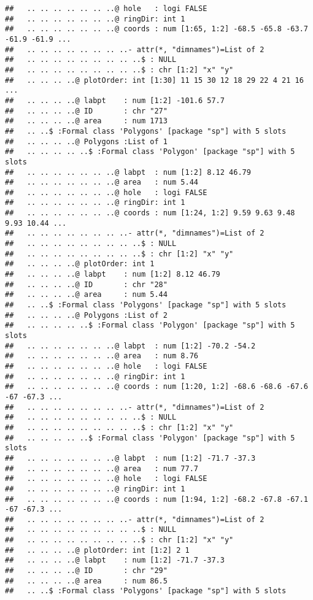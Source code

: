 \documentclass[]{article}
\begin{document}
\begin{verbatim}
##   .. .. .. .. .. .. ..@ hole   : logi FALSE
##   .. .. .. .. .. .. ..@ ringDir: int 1
##   .. .. .. .. .. .. ..@ coords : num [1:65, 1:2] -68.5 -65.8 -63.7 -61.9 -61.9 ...
##   .. .. .. .. .. .. .. ..- attr(*, "dimnames")=List of 2
##   .. .. .. .. .. .. .. .. ..$ : NULL
##   .. .. .. .. .. .. .. .. ..$ : chr [1:2] "x" "y"
##   .. .. .. ..@ plotOrder: int [1:30] 11 15 30 12 18 29 22 4 21 16 ...
##   .. .. .. ..@ labpt    : num [1:2] -101.6 57.7
##   .. .. .. ..@ ID       : chr "27"
##   .. .. .. ..@ area     : num 1713
##   .. ..$ :Formal class 'Polygons' [package "sp"] with 5 slots
##   .. .. .. ..@ Polygons :List of 1
##   .. .. .. .. ..$ :Formal class 'Polygon' [package "sp"] with 5 slots
##   .. .. .. .. .. .. ..@ labpt  : num [1:2] 8.12 46.79
##   .. .. .. .. .. .. ..@ area   : num 5.44
##   .. .. .. .. .. .. ..@ hole   : logi FALSE
##   .. .. .. .. .. .. ..@ ringDir: int 1
##   .. .. .. .. .. .. ..@ coords : num [1:24, 1:2] 9.59 9.63 9.48 9.93 10.44 ...
##   .. .. .. .. .. .. .. ..- attr(*, "dimnames")=List of 2
##   .. .. .. .. .. .. .. .. ..$ : NULL
##   .. .. .. .. .. .. .. .. ..$ : chr [1:2] "x" "y"
##   .. .. .. ..@ plotOrder: int 1
##   .. .. .. ..@ labpt    : num [1:2] 8.12 46.79
##   .. .. .. ..@ ID       : chr "28"
##   .. .. .. ..@ area     : num 5.44
##   .. ..$ :Formal class 'Polygons' [package "sp"] with 5 slots
##   .. .. .. ..@ Polygons :List of 2
##   .. .. .. .. ..$ :Formal class 'Polygon' [package "sp"] with 5 slots
##   .. .. .. .. .. .. ..@ labpt  : num [1:2] -70.2 -54.2
##   .. .. .. .. .. .. ..@ area   : num 8.76
##   .. .. .. .. .. .. ..@ hole   : logi FALSE
##   .. .. .. .. .. .. ..@ ringDir: int 1
##   .. .. .. .. .. .. ..@ coords : num [1:20, 1:2] -68.6 -68.6 -67.6 -67 -67.3 ...
##   .. .. .. .. .. .. .. ..- attr(*, "dimnames")=List of 2
##   .. .. .. .. .. .. .. .. ..$ : NULL
##   .. .. .. .. .. .. .. .. ..$ : chr [1:2] "x" "y"
##   .. .. .. .. ..$ :Formal class 'Polygon' [package "sp"] with 5 slots
##   .. .. .. .. .. .. ..@ labpt  : num [1:2] -71.7 -37.3
##   .. .. .. .. .. .. ..@ area   : num 77.7
##   .. .. .. .. .. .. ..@ hole   : logi FALSE
##   .. .. .. .. .. .. ..@ ringDir: int 1
##   .. .. .. .. .. .. ..@ coords : num [1:94, 1:2] -68.2 -67.8 -67.1 -67 -67.3 ...
##   .. .. .. .. .. .. .. ..- attr(*, "dimnames")=List of 2
##   .. .. .. .. .. .. .. .. ..$ : NULL
##   .. .. .. .. .. .. .. .. ..$ : chr [1:2] "x" "y"
##   .. .. .. ..@ plotOrder: int [1:2] 2 1
##   .. .. .. ..@ labpt    : num [1:2] -71.7 -37.3
##   .. .. .. ..@ ID       : chr "29"
##   .. .. .. ..@ area     : num 86.5
##   .. ..$ :Formal class 'Polygons' [package "sp"] with 5 slots

\end{verbatim}
\end{document}
